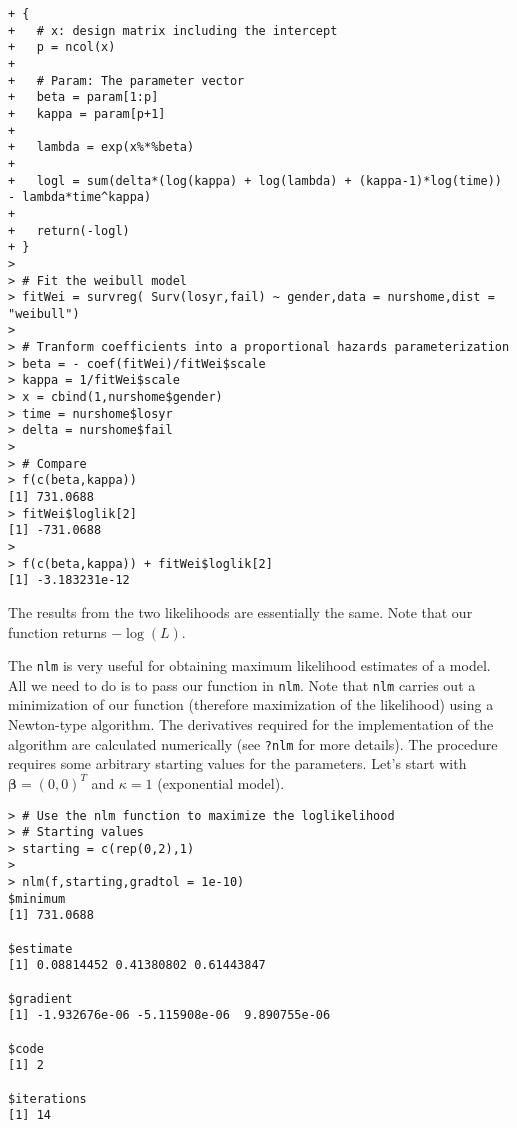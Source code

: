 \begin{enumerate}[(i)]
\begin{spacing}{1.2}
\begin{footnotesize}
\begin{verbatim}
+ {
+   # x: design matrix including the intercept
+   p = ncol(x)
+   
+   # Param: The parameter vector
+   beta = param[1:p]
+   kappa = param[p+1]
+   
+   lambda = exp(x%*%beta)
+   
+   logl = sum(delta*(log(kappa) + log(lambda) + (kappa-1)*log(time)) - lambda*time^kappa)
+   
+   return(-logl)
+ }
> 
> # Fit the weibull model
> fitWei = survreg( Surv(losyr,fail) ~ gender,data = nurshome,dist = "weibull")
> 
> # Tranform coefficients into a proportional hazards parameterization
> beta = - coef(fitWei)/fitWei$scale
> kappa = 1/fitWei$scale
> x = cbind(1,nurshome$gender)
> time = nurshome$losyr
> delta = nurshome$fail
> 
> # Compare
> f(c(beta,kappa))
[1] 731.0688
> fitWei$loglik[2]
[1] -731.0688
> 
> f(c(beta,kappa)) + fitWei$loglik[2]
[1] -3.183231e-12
\end{verbatim}
\end{footnotesize}
\end{spacing}
The results from the two likelihoods are essentially the same. Note that our function returns $-\log(L)$.

The \verb|nlm| is very useful for obtaining maximum likelihood estimates of a model. All we need to do is to pass our function in \verb|nlm|. Note that \verb|nlm| carries out a minimization of our function (therefore maximization of the likelihood) using a Newton-type algorithm. The derivatives required for the implementation of the algorithm are calculated numerically (see \verb|?nlm| for more details). The procedure requires some arbitrary starting values for the parameters. Let's start with $\boldsymbol{\beta} = (0,0)^{T}$ and $\kappa = 1$ (exponential model).
\begin{spacing}{1.2}
\begin{footnotesize}
\begin{verbatim}
> # Use the nlm function to maximize the loglikelihood
> # Starting values
> starting = c(rep(0,2),1)
> 
> nlm(f,starting,gradtol = 1e-10)
$minimum
[1] 731.0688

$estimate
[1] 0.08814452 0.41380802 0.61443847

$gradient
[1] -1.932676e-06 -5.115908e-06  9.890755e-06

$code
[1] 2

$iterations
[1] 14


\end{verbatim}
\end{footnotesize}
\end{spacing}
\end{enumerate}
